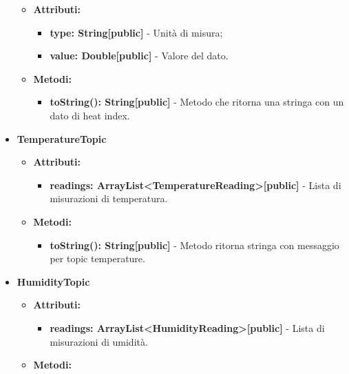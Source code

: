 \documentclass[8pt]{article}
\begin{document}
\begin{itemize}
\begin{itemize}
        \item \textbf{Attributi:}
        \begin{itemize}
            \item \textbf{type: String[public]} - Unità di misura;
            \item \textbf{value: Double[public]} - Valore del dato.
        \end{itemize}
    \end{itemize}
    \begin{itemize}
        \item \textbf{Metodi:}
        \begin{itemize}
            \item \textbf{toString(): String[public]} - Metodo che ritorna una stringa con un dato di heat index.
        \end{itemize}
    \end{itemize}
    \item \textbf{TemperatureTopic}
    \begin{itemize}
        \item \textbf{Attributi:}
        \begin{itemize}
            \item \textbf{readings: ArrayList<TemperatureReading>[public]} - Lista di misurazioni di temperatura.
        \end{itemize}
    \end{itemize}
    \begin{itemize}
        \item \textbf{Metodi:}
        \begin{itemize}
            \item \textbf{toString(): String[public]} - Metodo ritorna stringa con messaggio per topic temperature.
        \end{itemize}
    \end{itemize}
    \item \textbf{HumidityTopic}
    \begin{itemize}
        \item \textbf{Attributi:}
        \begin{itemize}
            \item \textbf{readings: ArrayList<HumidityReading>[public]} - Lista di misurazioni di umidità.
        \end{itemize}
    \end{itemize}
    \begin{itemize}
        \item \textbf{Metodi:}

\end{itemize}
\end{itemize}
\end{document}
